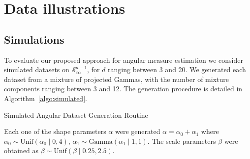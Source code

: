 
\section{Data illustrations\label{sec:results}}

\subsection{Simulations\label{subsec:simulated}}
To evaluate our proposed approach for angular measure estimation 
we consider simulated datasets on $\mathcal{S}_{\infty}^{d-1}$, for 
$d$ ranging between 3 and 20. We generated each dataset from a mixture of projected Gammas, with the number of mixture components
  ranging between 3 and 12.  The generation procedure is detailed in Algorithm~\ref{algo:simulated}.
  \begin{algorithm}[ht]
    \caption{Simulated Angular Dataset Generation Routine\label{algo:simulated}}
  \end{algorithm}
Each one of the shape parameters $\alpha$ were generated 
$\alpha = \alpha_0 + \alpha_1$ where
  $\alpha_0 \sim \text{Unif}(\alpha_0\mid 0,4)$, $\alpha_1\sim \text{Gamma}(\alpha_1\mid 1,1)$.
The scale parameters $\beta$ were obtained as $\beta\sim\text{Unif}(\beta\mid 0.25, 2.5)$.



